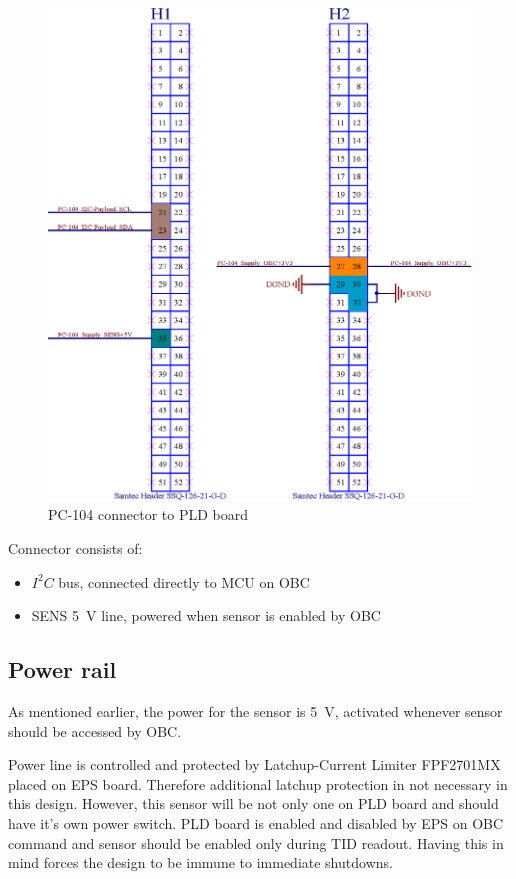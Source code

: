         \begin{figure}[H]
            \centering
            \includegraphics[width=0.5\paperwidth]{img/PC-104.eps}
            \caption{PC-104 connector to PLD board}
            \label{PC104_PLD}
        \end{figure}

        Connector consists of:
        \begin{itemize}
            \item $I^2C$ bus, connected directly to MCU on OBC
            \item SENS \SI{5}{\volt} line, powered when sensor is enabled by OBC
        \end{itemize}

    \subsection{Power rail}
        As mentioned earlier, the power for the sensor is \SI{+5}{\volt}, activated whenever sensor should be accessed by OBC.

        Power line is controlled and protected by Latchup-Current Limiter FPF2701MX placed on EPS board. Therefore additional latchup protection in not necessary in this design. However, this sensor will be not only one on PLD board and should have it's own power switch. PLD board is enabled and disabled by EPS on OBC command and sensor should be enabled only during TID readout. Having this in mind forces the design to be immune to immediate shutdowns.

